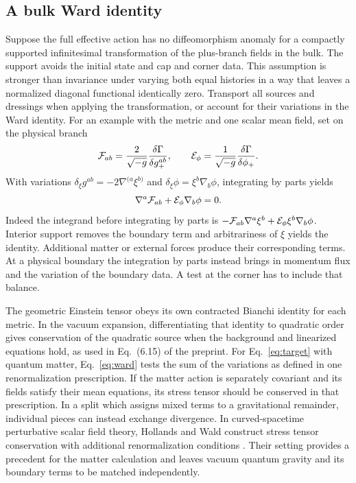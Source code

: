 \documentclass[11pt,letterpaper]{article}
\begin{document}
\subsection{A bulk Ward identity}
Suppose the full effective action has no diffeomorphism anomaly for a
compactly supported infinitesimal transformation of the plus-branch
fields in the bulk. The support avoids the initial state and cap and
corner data. This assumption is stronger than invariance under varying
both equal histories in a way that leaves a normalized diagonal
functional identically zero. Transport all sources and dressings when
applying the transformation, or account for their variations in the Ward
identity. For an example with the metric and one scalar mean field,
set on the physical branch
\[
 {\cal F}_{ab}=\frac{2}{\sqrt{-g}}\frac{\delta\Gamma}{\delta g_+^{ab}},
 \qquad
 {\cal E}_{\phi}=\frac1{\sqrt{-g}}\frac{\delta\Gamma}{\delta\phi_+}.
\]
With variations \(\delta_\xi g^{ab}=-2\nabla^{(a}\xi^{b)}\) and
\(\delta_\xi\phi=\xi^b\nabla_b\phi\), integrating by parts yields
\begin{equation}
 \nabla^a {\cal F}_{ab}
      +{\cal E}_\phi\nabla_b\phi=0 .
 \label{eq:ward}
\end{equation}
Indeed the integrand before integrating by parts is
\(-{\cal F}_{ab}\nabla^a\xi^b+
{\cal E}_\phi\xi^b\nabla_b\phi\). Interior support removes the
boundary term and arbitrariness of \(\xi\) yields the identity.
Additional matter or external forces produce their corresponding terms.
At a physical boundary the integration by parts instead brings in
momentum flux and the variation of the boundary data. A test at the
corner has to include that balance.

The geometric Einstein tensor obeys its own contracted Bianchi identity
for each metric. In the vacuum expansion, differentiating that identity
to quadratic order gives conservation of the quadratic source when the
background and linearized equations hold, as used in Eq.~(6.15) of the
preprint. For Eq.~\eqref{eq:target} with quantum matter,
Eq.~\eqref{eq:ward} tests the sum of the variations as defined in one
renormalization prescription. If the matter action is separately
covariant and its fields satisfy their mean equations, its stress tensor
should be conserved in that prescription. In a split which assigns mixed
terms to a gravitational remainder, individual pieces can instead
exchange divergence. In curved-spacetime perturbative scalar field
theory, Hollands and Wald construct stress tensor conservation with
additional renormalization conditions \cite{hw}. Their setting provides
a precedent for the matter calculation and leaves vacuum quantum gravity
and its boundary terms to be matched independently.
\end{document}

